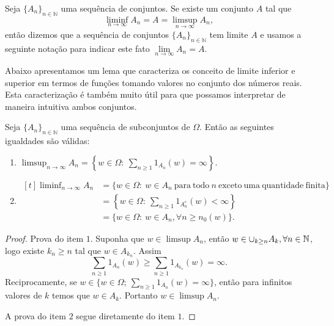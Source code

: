 \begin{definicao}
	Seja $\{A_n\}_{n\in\mathbb{N} }$  uma sequência de conjuntos.
	Se existe um conjunto $A$ tal que 
	\[
		\liminf \limits_{n \to \infty} A_n 
		= 
		A
		=
		\limsup \limits_{n \to \infty} A_n, 
	\]	
	então dizemos que a sequência de conjuntos 
	$\{A_n\}_{n\in\mathbb{N}}$ tem limite $A$  
	e usamos a seguinte notação para indicar este fato 
	$\lim \limits_{n \to \infty} A_n = A$.
\end{definicao}



Abaixo apresentamos um lema que caracteriza os 
conceito de limite inferior e superior em 
termos de funções tomando valores no 
conjunto dos números reais. Esta caracterização 
é também muito útil para que possamos interpretar
de maneira intuitiva ambos conjuntos.  


\begin{lema}
Seja $\{A_n\}_{n\in\mathbb{N}}$ uma sequência de subconjuntos de $\Omega$.
Então as seguintes igualdades são válidas:
\begin{enumerate}
\item 
$\displaystyle\limsup_{n\to\infty} A_n 
= 
\left\{ 
w \in \Omega: \ \sum_{n \geqslant 1} 1_{A_n}(w)= \infty 
\right\}
$.

\vspace*{0.3cm}


\item  
$
\begin{aligned}[t]
\liminf_{n\to\infty} A_n 
&=
	\{ w \in \Omega:
		\ w \in A_n\ \mathrm{para\ todo}\ n\ \mathrm{exceto\ uma\ quantidade\ finita} 
	\} 
\\
&= 
	\left\{w \in \Omega:
		\ \sum_{n\geqslant 1} 1_{A_n^c}(w) < \infty 
	\right\} 
\\[0.2cm]
&= 
	\{w \in \Omega:
		\ w \in A_n, \forall n \geqslant n_0(w) 
	\}. 
\end{aligned} 
$
\end{enumerate}
\end{lema}

\begin{proof}
Prova do item $1$. Suponha que $w \in \limsup A_n$, então 
$w \in \cup_{k \geq n} A_k,
\forall n \in \mathbb{N}$, logo existe $k_n \geqslant n$ tal que $w \in A_{k_n}$. 
Assim
%
	\[
		\sum \limits_{n \geqslant 1} 1_{A_n}(w) 
		\geqslant 
		\sum \limits_{n\geqslant 1} 1_{A_{k_n}}(w) 
		= 
		\infty.
	\]
%
Reciprocamente, 
se 
$ w \in \{ w \in \Omega;\ \sum_{n \geqslant 1} 1_{A_n}(w)= \infty \}$, 
então para infinitos valores de $k$ temos que $w \in A_k$. 
Portanto $w \in \limsup A_n$.

A prova do item $2$ segue diretamente do item $1$. 
\end{proof}



